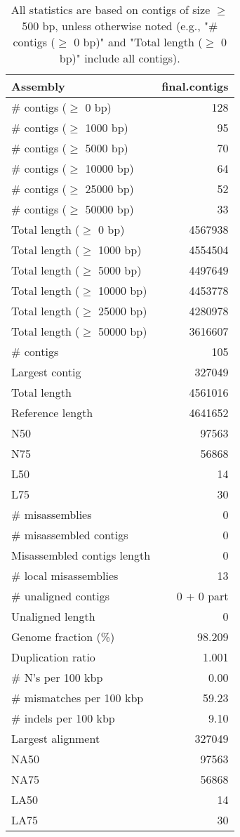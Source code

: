 \documentclass[12pt,a4paper]{article}
\begin{document}
\begin{table}[ht]
\begin{center}
\caption{All statistics are based on contigs of size $\geq$ 500 bp, unless otherwise noted (e.g., "\# contigs ($\geq$ 0 bp)" and "Total length ($\geq$ 0 bp)" include all contigs).}
\begin{tabular}{|l*{1}{|r}|}
\hline
Assembly & final.contigs \\ \hline
\# contigs ($\geq$ 0 bp) & 128 \\ \hline
\# contigs ($\geq$ 1000 bp) & 95 \\ \hline
\# contigs ($\geq$ 5000 bp) & 70 \\ \hline
\# contigs ($\geq$ 10000 bp) & 64 \\ \hline
\# contigs ($\geq$ 25000 bp) & 52 \\ \hline
\# contigs ($\geq$ 50000 bp) & 33 \\ \hline
Total length ($\geq$ 0 bp) & 4567938 \\ \hline
Total length ($\geq$ 1000 bp) & 4554504 \\ \hline
Total length ($\geq$ 5000 bp) & 4497649 \\ \hline
Total length ($\geq$ 10000 bp) & 4453778 \\ \hline
Total length ($\geq$ 25000 bp) & 4280978 \\ \hline
Total length ($\geq$ 50000 bp) & 3616607 \\ \hline
\# contigs & 105 \\ \hline
Largest contig & 327049 \\ \hline
Total length & 4561016 \\ \hline
Reference length & 4641652 \\ \hline
N50 & 97563 \\ \hline
N75 & 56868 \\ \hline
L50 & 14 \\ \hline
L75 & 30 \\ \hline
\# misassemblies & 0 \\ \hline
\# misassembled contigs & 0 \\ \hline
Misassembled contigs length & 0 \\ \hline
\# local misassemblies & 13 \\ \hline
\# unaligned contigs & 0 + 0 part \\ \hline
Unaligned length & 0 \\ \hline
Genome fraction (\%) & 98.209 \\ \hline
Duplication ratio & 1.001 \\ \hline
\# N's per 100 kbp & 0.00 \\ \hline
\# mismatches per 100 kbp & 59.23 \\ \hline
\# indels per 100 kbp & 9.10 \\ \hline
Largest alignment & 327049 \\ \hline
NA50 & 97563 \\ \hline
NA75 & 56868 \\ \hline
LA50 & 14 \\ \hline
LA75 & 30 \\ \hline
\end{tabular}
\end{center}
\end{table}
\end{document}
